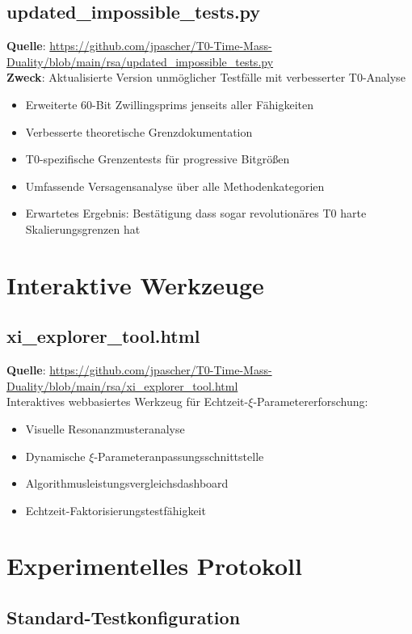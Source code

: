 \documentclass[12pt,a4paper]{article}
\begin{document}
	\subsection{updated\_impossible\_tests.py}
	\textbf{Quelle}: \url{https://github.com/jpascher/T0-Time-Mass-Duality/blob/main/rsa/updated_impossible_tests.py}\\
	\textbf{Zweck}: Aktualisierte Version unmöglicher Testfälle mit verbesserter T0-Analyse
	\begin{itemize}
		\item Erweiterte 60-Bit Zwillingsprims jenseits aller Fähigkeiten
		\item Verbesserte theoretische Grenzdokumentation
		\item T0-spezifische Grenzentests für progressive Bitgrößen
		\item Umfassende Versagensanalyse über alle Methodenkategorien
		\item Erwartetes Ergebnis: Bestätigung dass sogar revolutionäres T0 harte Skalierungsgrenzen hat
	\end{itemize}
	
	\section{Interaktive Werkzeuge}
	
	\subsection{xi\_explorer\_tool.html}
	\textbf{Quelle}: \url{https://github.com/jpascher/T0-Time-Mass-Duality/blob/main/rsa/xi_explorer_tool.html}\\
	Interaktives webbasiertes Werkzeug für Echtzeit-$\xi$-Parametererforschung:
	\begin{itemize}
		\item Visuelle Resonanzmusteranalyse
		\item Dynamische $\xi$-Parameteranpassungsschnittstelle
		\item Algorithmusleistungsvergleichsdashboard
		\item Echtzeit-Faktorisierungstestfähigkeit
	\end{itemize}
	
	\section{Experimentelles Protokoll}
	
	\subsection{Standard-Testkonfiguration}
	
\end{document}
